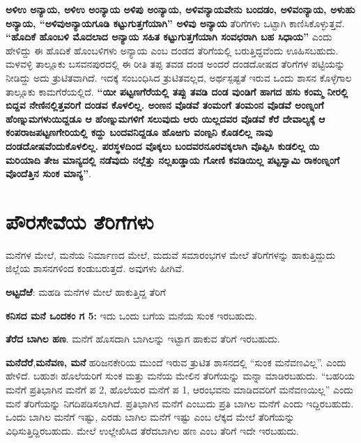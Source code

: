 \textbf{ಅಳಿಉ ಅನ್ಯಾಯ, ಅಳಿಉ ಅಂನ್ಯಾಯ ಅಳಿಪು ಅಂನ್ಯಾಯ, ಅಳಿವನ್ಯಾಯವೇನು ಬಂದಡಂ, ಅಳಿವಂನ್ಯಾಯ, ಅಳುಹು ಅನ್ಯಾಯ, “ಅಳಿವುಅನ್ಯಾಯಗೂಡಿ ಕಟ್ಟುಗುತ್ತಗೆಯಾಗಿ” ಅಳಿವು ಅನ್ಯಾಯ} ತೆರಿಗೆಗಳು ಒಟ್ಟಾಗಿ ಕಾಣಿಸಿಕೊಳ್ಳುತ್ತವೆ. \textbf{“ಹೊದಿಕೆ ಹೊಂಬಳಿ ಮೊದಲಾದ ಅನ್ಯಾಯ ಸಹಿತ ಕಟ್ಟುಗುತ್ತಗೆಯಾಗಿ ಸಂವಛರಾಗಿ ಬಹ ಸಿಧಾಯ”} ಎಂದು ಹೇಳಿದ್ದು ಈ ಹೊದಿಕೆ ಹೊಂಬಳಿಗಳು ಅನ್ಯಾಯ ಎಂಬ ದಂಡದ ತೆರಿಗೆಯಲ್ಲಿ ಬರುತ್ತಿದ್ದವೆಂದು ಊಹಿಸಬಹುದು. ಮಳವಳ್ಳಿ ತಾಲ್ಲೂಕು ಬಸವನಪುರದಲ್ಲಿ ಈ ರೀತಿ ತಪ್ಪ ತವಡ ದಂಡ ಅಂದರೆ ದಂಡದೋಷದ ತೆರಿಗೆಗಳ ಪಟ್ಟಿಯನ್ನು ನೀಡಿದ್ದು ಅದು ತ್ರುಟಿತವಾಗಿದೆ. ಇದಕ್ಕೆ ಸಂಬಂಧಿಸಿದ ತ್ರುಟಿತವಲ್ಲದ, ಅರ್ಥಸ್ಪಷ್ಟತೆ ಇರುವ ಒಂದು ಶಾಸನ ಕೊಳ್ಳೆಗಾಲ ತಾಲ್ಲೂಕು ಕಾಮಗೆರೆಯಲ್ಲಿದೆ. \textbf{“ಯೀ ಪಟ್ಟಣಗೆರೆಯಲ್ಲಿ ತಪ್ಪು ತವಡಿ ದಂಡ ವುಂಡಿಗೆ ಹಾಗದ ಹಸು ಕಂಮ್ಮ ನೀರಲ್ಲಿ ಬಿದ್ದವ ನೇಣಿನಲ್ಲಿತ್ತವರಿಗೆ ದಂಡವ ಕೊಳಲಿಲ್ಲ. ಅಂಣನ ವೊಡವೆ ತಂಮಂಗೆ ತಂಮಂನ ವೊಡವೆ ಅಂಣ್ನಂಗೆ ಹೆಂಣ್ನುಮಗಳುಯಿದ್ದಡೂ ಆ ಹೆಂಣ್ನುಮಗಳಿಗೆ ಸಲುವುದು ಆರು ಯಿಲ್ಲದವರ ವೊಡವೆ ಕೆರೆ ದೇವಾಲ್ಯಕ್ಕೆ ಆ ಕಂಪರಾಜಪಟ್ಟಣಗೇರಿಯಲ್ಲಿ ಕದ್ದು ಬಂದವನಿದ್ದಡೂ ಹೊಱಗು ವಂಣ್ಪನಿ ಕೊಡಲಿಲ್ಲ ನಾವು ದಂಡದೋಷವೆಂದುಕೊಳಲಿಲ್ಲ. ಪರಸ್ಥಳದಿಂದ ವೊಕ್ಕಲು ಬಂದವರನೂರವಕ್ಕಲಾಗಿ ವೊಪ್ಪಿಸಿ ಕುಡಲಿಲ್ಲ ಯಿ ಮರಿಯಾದಿ ತೇಜ ಮಾನ್ಯದಲ್ಲಿ ನಡೆವುದು ನಲ್ಲೆತ್ತು ನಲ್ಲಖಡ್ಡಾಯ ಗೋಣಿ ಕವಡಿಯಿಲ್ಲ ಪಟ್ಟಸ್ವಾಮಿ ರಾಕಂಣ್ನಂಗೆ ವೊಂದೆತ್ತಿನ ಸುಂಕ ಮಾನ್ಯ”}.


\section{ಪೌರಸೇವೆಯ ತೆರಿಗೆಗಳು}

ಮನೆಗಳ ಮೇಲೆ, ಮನೆಯ ನಿರ್ಮಾಣದ ಮೇಲೆ, ಮದುವೆ ಸಮಾರಂಭಗಳ ಮೇಲೆ ತೆರಿಗೆಗಳನ್ನು ಹಾಕುತ್ತಿದ್ದುದು ಜಿಲ್ಲೆಯ ಶಾಸನಗಳಿಂದ ಕಂಡುಬರುತ್ತದೆ. ಅವುಗಳು ಹೀಗಿವೆ. 

\textbf{ಅಟ್ಟದೆಱೆ}: ಮಹಡಿ ಮನೆಗಳ ಮೇಲೆ ಹಾಕುತ್ತಿದ್ದ ತೆರಿಗೆ

\textbf{ಕನಿಸದ ಮನೆ ಒಂದಕಂ ಗ 5: } ಇದು ಒಂದು ಬಗೆಯ ಮನೆಯ ಸುಂಕ ಇರಬಹುದು.

\textbf{ತೆರೆದ ಬಾಗಿಲ ಹಣ}. ಮನೆಗೆ ಹೊಸದಾಗಿ ಬಾಗಿಲನ್ನು ಇಟ್ಟಾಗ ಹಾಕುವ ತೆರಿಗೆ ಇರಬಹುದು.

\textbf{ಮನೆದೆರೆ},\textbf{ಮನೆವಣ, ಮನೆ} ಹರಿಜನಕೇರಿಯ ಮುಂದೆ ಇರುವ ತ್ರುಟಿತ ಶಾಸನದಲ್ಲಿ “ಸುಂಕ ಮನೆವಣವಿಲ್ಲ”. ಎಂದು ಹೇಳಿದೆ. ಬಹುಶಃ ಹೊಲೆಯರಿಗೆ ಸುಂಕ ಮತ್ತು ಮನೆಯ ಮೇಲಿನ ತೆರಿಗೆಯನ್ನು ಮನ್ನಾ ಮಾಡಿರಬಹುದು. “ಬಹರಿಯ ಮನೆಗೆ ಪ್ರತಿಭಾಗಿನ ಮನೆಗೆ ಪ 2, ಹೊಲೆಯರ ಮನೆಗೆ ಪ 1, ಆರಂಭವನು ಮಾಡಿದವರಿಗೆ ಮನೆವಣಯಿಲ್ಲ” ಎಂದು ಮನೆ ತೆರಿಗೆಯನ್ನು ನಿಗದಿಪಡಿಸಲಾಗಿದೆ. ಪ್ರತಿಭಾಗಿನ ಮನೆಗೆ ಎಂಬುದು ಪ್ರತಿ ಬಾಗಿಲ ಮನೆಗೆ ಎಂದು ಇದ್ದಿರಬಹುದು. ಒಂದು ಬಾಗಿಲ ಮನೆಗೆ ಇಷ್ಟು, ಎರಡು ಬಾಗಿಲ ಮನೆಗೆ ಇಷ್ಟು ಎಂಬ ಲೆಕ್ಕದ ಮೇಲೆ ತೆರಿಗೆಯನ್ನು ವಿಧಿಸುತ್ತಿದ್ದಿರಬಹುದು. ಮೇಲೆ ಉಲ್ಲೇಖಿಸಿದ ತೆರೆದಬಾಗಿಲ ಹಣ ಎಂಬ ತೆರಿಗೆ ಇದೇ ಇರಬಹುದು.

